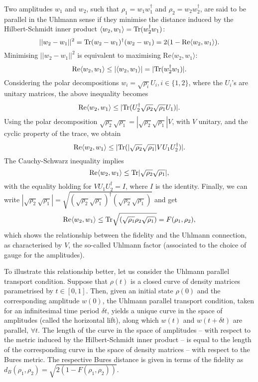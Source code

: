 Two amplitudes $w_{1}$ and $w_{2}$, such that $\rho_{1}=w_1 w_1^\dagger$ and $\rho_{2}=w_2 w_2^\dagger$, are said to be parallel in the Uhlmann sense if they minimise the distance induced by the Hilbert-Schmidt inner product $\langle w_{2},w_{1}\rangle=\text{Tr}(w_{2}^{\dagger}w_{1})$: 
\begin{equation*}
||w_2-w_1||^2=\text{Tr}(w_2-w_1)^\dagger (w_2-w_1)=2(1-\text{Re}\langle w_2,w_1\rangle).	
\end{equation*}
Minimising $||w_2-w_1||^2$ is equivalent to maximising $\text{Re}\langle w_{2},w_{1}\rangle$: 
\begin{equation*}
\text{Re}\langle w_{2},w_{1}\rangle\leq|\langle w_{2},w_{1}\rangle|  =|\text{Tr}(w_{2}^{\dagger}w_1)|.
\end{equation*}
Considering the polar decompositions $w_{i}=\sqrt{\rho_{i}}U_{i},i\in\{1,2\}$, where the $U_i$'s are unitary matrices, the above inequality becomes
\begin{equation*}
\text{Re}\langle w_{2},w_{1}\rangle \leq 
|\text{Tr}(U_{2}^{\dagger}\sqrt{\rho_{2}}\sqrt{\rho_{1}}U_{1})|.
\end{equation*}
Using the polar decomposition $\sqrt{\rho_{2}}\sqrt{\rho_{1}}=|\sqrt{\rho_{2}}\sqrt{\rho_{1}}|V$, with $V$ unitary, and the cyclic property of the trace, we obtain
\begin{equation*}
\text{Re}\langle w_{2},w_{1}\rangle \leq 
|\text{Tr}(|\sqrt{\rho_{2}}\sqrt{\rho_{1}}  |VU_{1}U_{2}^{\dagger})|.
\end{equation*}
The Cauchy-Schwarz inequality implies 
\begin{equation*}
\text{Re}\langle w_{2},w_{1}\rangle \leq 
\text{Tr}|\sqrt{\rho_{2}}\sqrt{\rho_{1}}|,
\end{equation*}
with the equality holding for $V U_1 U_2^\dagger=I$, where $I$ is the identity. Finally, we can write $|\sqrt{\rho_{2}}\sqrt{\rho_{1}}|=\sqrt{(\sqrt{\rho_{2}}\sqrt{\rho_{1}})^{\dagger}(\sqrt{\rho_{2}}\sqrt{\rho_{1}})}$ and get
\begin{equation*}
\text{Re}\langle w_{2},w_{1}\rangle \leq 
\text{Tr}\sqrt{(\sqrt{\rho_{1}}\rho_{2}  \sqrt{\rho_{1}})}=F(\rho_{1},\rho_{2}),
\end{equation*}
which shows the relationship between the fidelity and the Uhlmann connection, as characterised by $V$, the so-called Uhlmann factor (associated to the choice of gauge for the amplitudes).

To illustrate this relationship better, let us consider the Uhlmann parallel transport condition. Suppose that $\rho(t)$ is a closed curve of density matrices parametrised by $t \in [0,1]$. Then, given an initial state $\rho(0)$ and the corresponding amplitude $w(0)$, the Uhlmann parallel transport condition, taken for an infinitesimal time period $\delta t$, yields a unique curve in the space of amplitudes (called the horizontal lift), along which $w(t)$ and $w(t+\delta t)$ are parallel, $\forall t$. The length of the curve in the space of amplitudes -- with respect to the metric induced by the Hilbert-Schmidt inner product -- is equal to the length of the corresponding curve in the space of density matrices -- with respect to the Bures metric. The respective Bures distance is given in terms of the fidelity as $d_B(\rho_1,\rho_2)=\sqrt{2(1-F(\rho_1,\rho_2))}$.

